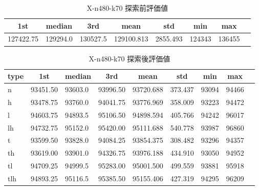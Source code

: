 \begin{table}[htbp]
    \caption{X-n480-k70 探索前評価値}
    \begin{tabular}{|l|l|l|l|l|l|l|l|}\hline
    \multicolumn{1}{|c|}{\textbf{1st}}
    &\multicolumn{1}{c|}{\textbf{median}}
    &\multicolumn{1}{c|}{\textbf{3rd}}
    &\multicolumn{1}{c|}{\textbf{mean}}
    &\multicolumn{1}{c|}{\textbf{std}}
    &\multicolumn{1}{c|}{\textbf{min}}
    &\multicolumn{1}{c|}{\textbf{max}}\\\hline
	127422.75 & 129294.0 & 130527.5 & 129100.813 & 2855.493 & 124343 & 136455\\\hline
	\end{tabular}
\end{table}
\begin{table}[htbp]
    \caption{X-n480-k70 探索後評価値}
    \begin{tabular}{|l|l|l|l|l|l|l|l|l|}\hline
    \multicolumn{1}{|c|}{\textbf{type}}
    &\multicolumn{1}{|c|}{\textbf{1st}}
    &\multicolumn{1}{c|}{\textbf{median}}
    &\multicolumn{1}{c|}{\textbf{3rd}}
    &\multicolumn{1}{c|}{\textbf{mean}}
    &\multicolumn{1}{c|}{\textbf{std}}
    &\multicolumn{1}{c|}{\textbf{min}}
    &\multicolumn{1}{c|}{\textbf{max}}\\\hline
	n & 93451.50 & 93603.0 & 93996.50 & 93720.688 & 373.437 & 93094 & 94466\\\hline
	h & 93478.75 & 93760.0 & 94041.75 & 93776.969 & 358.009 & 93223 & 94472\\\hline
	l & 94603.75 & 94893.5 & 95106.50 & 94898.594 & 405.766 & 94242 & 96017\\\hline
	lh & 94732.75 & 95152.0 & 95420.00 & 95111.688 & 540.778 & 93987 & 96860\\\hline
	t & 93599.50 & 93828.0 & 94084.25 & 93854.375 & 308.482 & 93296 & 94357\\\hline
	th & 93619.00 & 93901.0 & 94326.75 & 93976.188 & 434.910 & 93050 & 94952\\\hline
	tl & 94709.25 & 94999.5 & 95283.00 & 95001.500 & 499.559 & 93881 & 95918\\\hline
	tlh & 94893.25 & 95116.5 & 95385.50 & 95155.406 & 427.319 & 94295 & 96209\\\hline
	\end{tabular}
\end{table}
